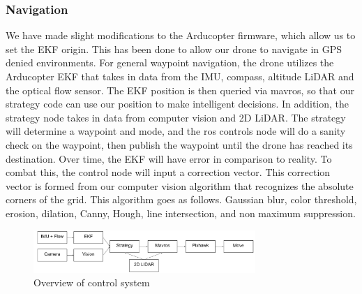 \documentclass[12pt,letterpaper]{article}
\begin{document}
		\subsubsection*{Navigation}
			We have made slight modifications to the Arducopter firmware, which allow us to set the EKF origin. This has been done to allow our drone to navigate in GPS denied environments. For general waypoint navigation, the drone utilizes the Arducopter EKF that takes in data from the IMU, compass, altitude LiDAR and the optical flow sensor. The EKF position is then queried via mavros, so that our strategy code can use our position to make intelligent decisions. In addition, the strategy node takes in data from computer vision and 2D LiDAR. The strategy will determine a waypoint and mode, and the ros controls node will do a sanity check on the waypoint, then publish the waypoint until the drone has reached its destination. Over time, the EKF will have error in comparison to reality. To combat this, the control node will input a correction vector. This correction vector is formed from our computer vision algorithm that recognizes the absolute corners of the grid. This algorithm goes as follows. Gaussian blur, color threshold, erosion, dilation, Canny, Hough, line intersection, and non maximum suppression.

		\begin{figure}[!htbp]
			\begin{center}
				\includegraphics[width=0.75\textwidth]{system}
				\caption*{Overview of control system}
			\end{center}
		\end{figure}

\end{document}
